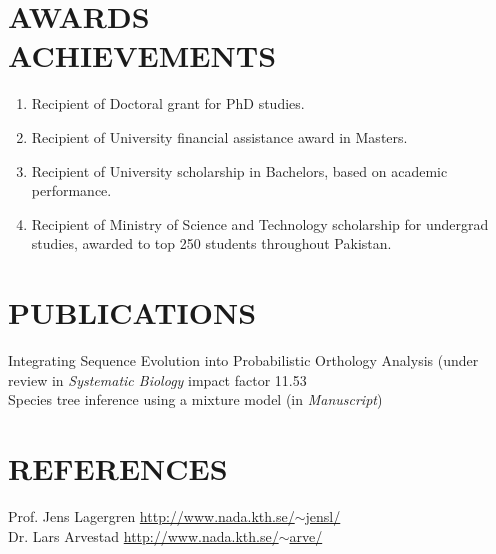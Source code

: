 \documentclass[margin, 10pt]{res} %
\begin{document}
\begin{resume}

\section{AWARDS \\ ACHIEVEMENTS} 

\begin{enumerate}
\item Recipient of Doctoral grant for PhD studies.
\item Recipient of University financial assistance award in Masters.
\item Recipient of University scholarship in Bachelors, based on academic performance.
\item Recipient of Ministry of Science and Technology scholarship for undergrad studies, awarded to top 250 students throughout Pakistan.
\end{enumerate} 


\section{PUBLICATIONS} 

Integrating Sequence Evolution into Probabilistic Orthology Analysis (under review in {\sl Systematic Biology} impact factor 11.53\\
Species tree inference using a mixture model (in {\sl Manuscript})


\section{REFERENCES} 
Prof. Jens Lagergren \hfill \href{http://www.nada.kth.se/~jensl/}{http://www.nada.kth.se/$\sim$jensl/} \\
Dr. Lars Arvestad \hfill \href{http://www.nada.kth.se/~arve/}{http://www.nada.kth.se/$\sim$arve/}


\end{resume}
\end{document}
